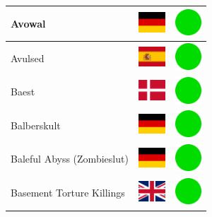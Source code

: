 \documentclass[12pt, a4paper, twoside]{report}
\begin{document}
\begin{center}
\begin{longtable}{|p{5cm}|p{2cm}|p{2cm}|}
			Avowal & \includegraphics[width=1cm]{4x3/de} & \includegraphics[width=1cm]{likes/y} \\ \hline
			Avulsed & \includegraphics[width=1cm]{4x3/es} & \includegraphics[width=1cm]{likes/y} \\ \hline
			Baest & \includegraphics[width=1cm]{4x3/dk} & \includegraphics[width=1cm]{likes/y} \\ \hline
			Balberskult & \includegraphics[width=1cm]{4x3/de} & \includegraphics[width=1cm]{likes/y} \\ \hline
			Baleful Abyss (Zombieslut) & \includegraphics[width=1cm]{4x3/de} & \includegraphics[width=1cm]{likes/y} \\ \hline
			Basement Torture Killings & \includegraphics[width=1cm]{4x3/gb} & \includegraphics[width=1cm]{likes/y} \\ \hline

\end{longtable}
\end{center}
\end{document}
